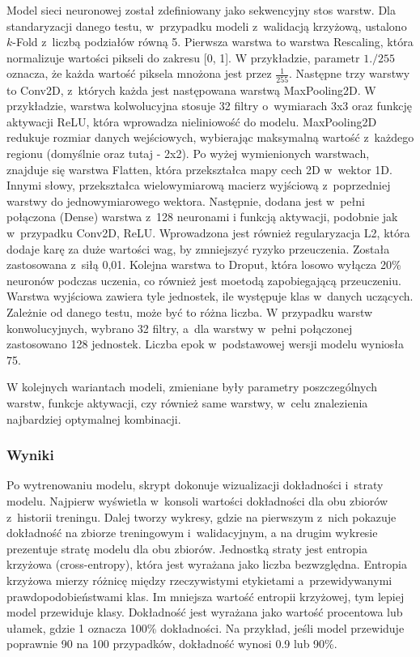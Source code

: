 Model sieci neuronowej został zdefiniowany jako sekwencyjny stos warstw.
Dla standaryzacji danego testu, w~przypadku modeli z~walidacją krzyżową, ustalono $k$-Fold z~liczbą podziałów równą 5.
Pierwsza warstwa to warstwa Rescaling, która normalizuje wartości pikseli do zakresu [0, 1].
W przykładzie, parametr $1./255$ oznacza, że każda wartość piksela mnożona jest przez $\frac{1}{255}$.
Następne trzy warstwy to Conv2D, z~których każda jest następowana warstwą MaxPooling2D.
W przykładzie, warstwa kolwolucyjna stosuje 32 filtry o~wymiarach 3x3 oraz funkcję aktywacji ReLU,
która wprowadza nieliniowość do modelu.
MaxPooling2D redukuje rozmiar danych wejściowych,
wybierając maksymalną wartość z~każdego regionu (domyślnie oraz tutaj - 2x2). 
Po wyżej wymienionych warstwach, znajduje się warstwa Flatten, która przekształca mapy cech 2D w~wektor 1D.
Innymi słowy, przekształca wielowymiarową macierz wyjściową z~poprzedniej warstwy do jednowymiarowego wektora.
Następnie, dodana jest w~pełni połączona (Dense) warstwa z~128 neuronami
i funkcją aktywacji, podobnie jak w~przypadku Conv2D, ReLU.
Wprowadzona jest również regularyzacja L2, która dodaje karę za duże wartości wag,
by zmniejszyć ryzyko przeuczenia. Została zastosowana z~siłą 0,01.
Kolejna warstwa to Droput, która losowo wyłącza 20\% neuronów podczas uczenia,
co również jest moetodą zapobiegającą przeuczeniu.
Warstwa wyjściowa zawiera tyle jednostek, ile występuje klas w~danych uczących.
Zależnie od danego testu, może być to różna liczba.
W przypadku warstw konwolucyjnych, wybrano 32 filtry, a~dla warstwy w~pełni połączonej zastosowano 128 jednostek.
Liczba epok w~podstawowej wersji modelu wyniosła 75.

W kolejnych wariantach modeli, zmieniane były parametry poszczególnych warstw, funkcje aktywacji,
czy również same warstwy, w~celu znalezienia najbardziej optymalnej kombinacji.

\subsubsection{Wyniki}
Po wytrenowaniu modelu, skrypt dokonuje wizualizacji dokładności i~straty modelu.
Najpierw wyświetla w~konsoli wartości dokładności dla obu zbiorów z~historii treningu.
Dalej tworzy wykresy, gdzie na pierwszym z~nich pokazuje dokładność na zbiorze treningowym i~walidacyjnym,
a na drugim wykresie prezentuje stratę modelu dla obu zbiorów.
Jednostką straty jest entropia krzyżowa (cross-entropy), która jest wyrażana jako liczba bezwzględna.
Entropia krzyżowa mierzy różnicę między rzeczywistymi etykietami a~przewidywanymi prawdopodobieństwami klas.
Im mniejsza wartość entropii krzyżowej, tym lepiej model przewiduje klasy.
Dokładność jest wyrażana jako wartość procentowa lub ułamek, gdzie 1 oznacza 100\% dokładności.
Na przykład, jeśli model przewiduje poprawnie 90 na 100 przypadków, dokładność wynosi 0.9 lub 90\%.

